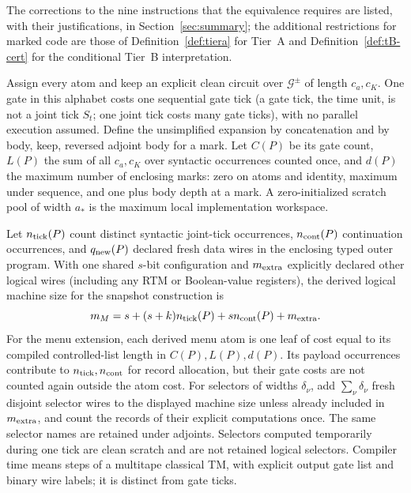 \begin{remark}\label{rem:corrections}
The corrections to the nine instructions that the equivalence requires
are listed, with their justifications, in Section~\ref{sec:summary}; the
additional restrictions for marked code are those of
Definition~\ref{def:tiera} for Tier~A and
Definition~\ref{def:tB-cert} for the conditional Tier~B interpretation.
\end{remark}

\begin{definition}\label{def:costs}
Assign every atom and keep an explicit clean circuit over $\mathcal G^{\pm}$
of length $c_a,c_K$. One gate in this alphabet costs one sequential gate
tick (a gate tick, the time unit, is not a joint tick $S_t$; one joint
tick costs many gate ticks), with no parallel execution assumed. Define the unsimplified expansion
by concatenation and by body, keep, reversed adjoint body for a mark.
Let $C(P)$ be its gate count, $L(P)$ the sum of all $c_a,c_K$ over
syntactic occurrences counted once, and $d(P)$ the maximum number of
enclosing marks: zero on atoms and identity, maximum under sequence,
and one plus body depth at a mark. A zero-initialized scratch pool of
width $a_*$ is the maximum local implementation workspace.

Let $n_{\rm tick}(P)$ count distinct syntactic joint-tick occurrences,
$n_{\rm cont}(P)$ continuation occurrences, and $q_{\rm new}(P)$ declared
fresh data wires in the enclosing typed outer program. With one shared
$s$-bit configuration and $m_{\rm extra}$ explicitly declared other
logical wires (including any RTM or Boolean-value registers), the derived
logical machine size for the snapshot construction is
\[
 m_M=s+(s+k)n_{\rm tick}(P)+s n_{\rm cont}(P)+m_{\rm extra}.
\]
For the menu extension, each derived menu atom is one leaf of cost
equal to its compiled controlled-list length in $C(P),L(P),d(P)$.
Its payload occurrences contribute to $n_{\rm tick},n_{\rm cont}$ for
record allocation, but their gate costs are not counted again outside
the atom cost. For selectors of widths $\delta_\nu$, add
$\sum_\nu\delta_\nu$ fresh disjoint selector wires to
the displayed machine size unless already included in $m_{\rm extra}$,
and count the records of their explicit computations once. The same
selector names are retained under adjoints. Selectors computed temporarily during
one tick are clean scratch and are not retained logical selectors.
Compiler time means steps of a multitape classical TM, with explicit
output gate list and binary wire labels; it is distinct from gate ticks.
\end{definition}


